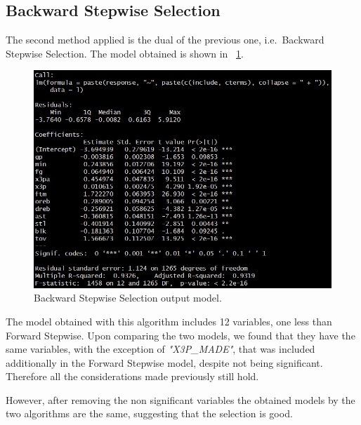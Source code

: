 \subsection{Backward Stepwise Selection}

The second method applied is the dual of the previous one, i.e.\ Backward Stepwise Selection. The model obtained is shown in \Fig~\ref{fig:BackwardModelSummary}.
\begin{figure}[h]
	\centering
	\includegraphics[width=0.35\linewidth]{ImageFiles/Regression/Backward/BackwardModelSummary}
	\caption{Backward Stepwise Selection output model.}
	\label{fig:BackwardModelSummary}
\end{figure}

The model obtained with this algorithm includes 12 variables, one less than Forward Stepwise. Upon comparing the two models, we found that they have the same variables, with the exception of \textit{"X3P\_MADE"}, that was included additionally in the Forward Stepwise model, despite not being significant.
Therefore all the considerations made previously still hold.

However, after removing the non significant variables the obtained models by the two algorithms are the same, suggesting that the selection is good.